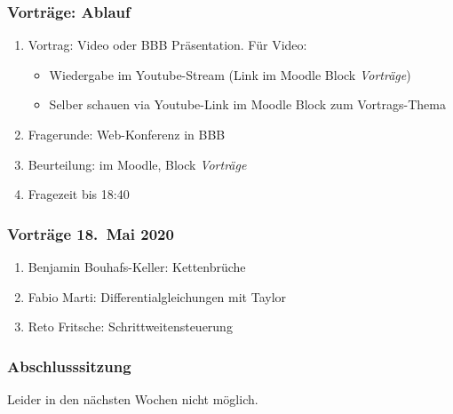 %
%
%


\begin{frame}
\frametitle{Vorträge: Ablauf}
\begin{enumerate}
\item<2-> Vortrag: Video oder BBB Präsentation. Für Video:
\begin{itemize}
\item<3-> Wiedergabe im Youtube-Stream  (Link im Moodle Block {\em Vorträge})
\item<4-> Selber schauen via Youtube-Link im Moodle Block zum Vortrags-Thema
\end{itemize}
\item<5-> Fragerunde: Web-Konferenz in BBB
\item<6-> Beurteilung: im Moodle, Block {\em Vorträge}
\bigskip
\item<7-> Fragezeit bis 18:40
\end{enumerate}
\end{frame}

\begin{frame}
\frametitle{Vorträge 18.~Mai 2020}
\begin{enumerate}
\item<2->
Benjamin Bouhafs-Keller: Kettenbrüche
\bigskip

\item<3->
Fabio Marti: Differentialgleichungen mit Taylor
\bigskip

\item<4->
Reto Fritsche: Schrittweitensteuerung

\end{enumerate}
\end{frame}

\begin{frame}
\frametitle{Abschlusssitzung}
\begin{center}
Leider in den nächsten Wochen nicht möglich.
\bigskip

\end{center}

\end{frame}

